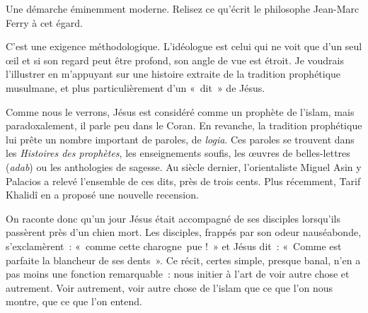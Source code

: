 Une démarche éminemment moderne. Relisez ce qu'écrit le philosophe
Jean-Marc Ferry à cet égard.


C'est une exigence méthodologique. L'idéologue est celui qui ne voit que
d'un seul œil et si son regard peut être profond, son angle de vue est
étroit. Je voudrais l'illustrer en m'appuyant sur une histoire extraite
de la tradition prophétique musulmane, et plus particulièrement d'un
«~dit~» de Jésus.

Comme nous le verrons, Jésus est considéré comme un prophète de l'islam,
mais paradoxalement, il parle peu dans le Coran. En revanche, la
tradition prophétique lui prête un nombre important de paroles, de
\emph{logia}. Ces paroles se trouvent dans les \emph{Histoires des
prophètes}, les enseignements soufis, les œuvres de belles-lettres
(\emph{adab}) ou les anthologies de sagesse. Au siècle dernier,
l'orientaliste Miguel Asin y Palacios a relevé l'ensemble de ces dits,
près de trois cents. Plus récemment, Tarif Khalidî en a proposé une
nouvelle recension.

On raconte donc qu'un jour Jésus était accompagné de ses disciples
lorsqu'ils passèrent près d'un chien mort. Les disciples, frappés
par son odeur nauséabonde, s'exclamèrent~: «~comme cette charogne~pue
!~» et Jésus dit~: «~Comme est parfaite la blancheur de ses dents~». Ce
récit, certes simple, presque banal, n'en a pas moins une fonction
remarquable~: nous initier à l'art de voir autre chose et autrement.
Voir autrement, voir autre chose de l'islam que ce que l'on nous montre,
que ce que l'on entend.

